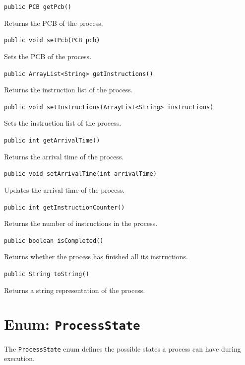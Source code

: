 \documentclass[12pt,a4paper]{article}
\begin{document}
\begin{signaturebox}
\texttt{public PCB getPcb()}
\end{signaturebox}
Returns the PCB of the process.

\begin{signaturebox}
\texttt{public void setPcb(PCB pcb)}
\end{signaturebox}
Sets the PCB of the process.

\begin{signaturebox}
\texttt{public ArrayList<String> getInstructions()}
\end{signaturebox}
Returns the instruction list of the process.

\begin{signaturebox}
\texttt{public void setInstructions(ArrayList<String> instructions)}
\end{signaturebox}
Sets the instruction list of the process.

\begin{signaturebox}
\texttt{public int getArrivalTime()}
\end{signaturebox}
Returns the arrival time of the process.

\begin{signaturebox}
\texttt{public void setArrivalTime(int arrivalTime)}
\end{signaturebox}
Updates the arrival time of the process.

\begin{signaturebox}
\texttt{public int getInstructionCounter()}
\end{signaturebox}
Returns the number of instructions in the process.

\begin{signaturebox}
\texttt{public boolean isCompleted()}
\end{signaturebox}
Returns whether the process has finished all its instructions.

\begin{signaturebox}
\texttt{public String toString()}
\end{signaturebox}
Returns a string representation of the process.

\section{Enum: \texttt{ProcessState}}

\begin{purposebox}
The \texttt{ProcessState} enum defines the possible states a process can have during execution.
\end{purposebox}
\end{document}
